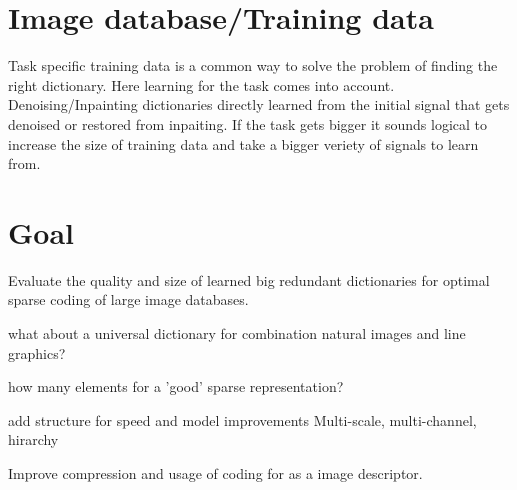 \section{Image database/Training data}
Task specific training data is a common way to solve the problem of finding the right dictionary. 
Here learning for the task comes into account. Denoising/Inpainting dictionaries directly learned from the initial
signal that gets denoised or restored from inpaiting.
If the task gets bigger it sounds logical to increase the size of training data and take a bigger veriety of signals to learn from.


\section{Goal}
Evaluate the quality and size of learned big redundant dictionaries for 
optimal sparse coding of large image databases.

what about a universal dictionary for combination natural images and line graphics?
 
how many elements for a 'good' sparse representation?

add structure for speed and model improvements
Multi-scale, multi-channel, hirarchy

Improve compression and usage of coding for as a image descriptor.
